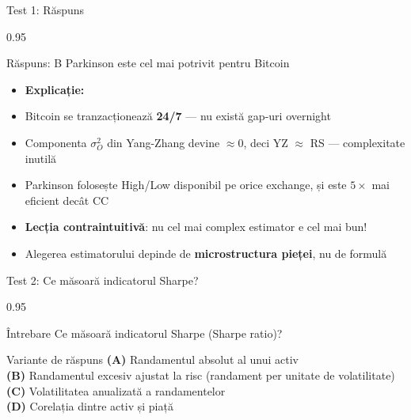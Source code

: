 \documentclass[9pt, aspectratio=169, t]{beamer}
\begin{document}
\begin{frame}[shrink=10]{Test 1: Răspuns}
\begin{cminipage}{0.95\textwidth}
    \begin{exampleblock}{Răspuns: B}
        Parkinson este cel mai potrivit pentru Bitcoin
    \end{exampleblock}

    \vspace{0.2cm}

    \begin{itemize}\setlength{\itemsep}{0pt}
        \item \textbf{Explicație:}
        \item Bitcoin se tranzacționează \textbf{24/7} --- nu există gap-uri overnight
        \item Componenta $\sigma_O^2$ din Yang-Zhang devine $\approx 0$, deci YZ $\approx$ RS --- complexitate inutilă
        \item Parkinson folosește High/Low disponibil pe orice exchange, și este $5\times$ mai eficient decât CC
        \item \textbf{Lecția contraintuitivă}: nu cel mai complex estimator e cel mai bun!
        \item Alegerea estimatorului depinde de \textbf{microstructura pieței}, nu de formulă
    \end{itemize}
\end{cminipage}
\end{frame}

\begin{frame}[shrink=10]{Test 2: Ce măsoară indicatorul Sharpe?}
\begin{cminipage}{0.95\textwidth}
    \begin{alertblock}{Întrebare}
        Ce măsoară indicatorul Sharpe (Sharpe ratio)?
    \end{alertblock}

    \vspace{0.5cm}
    \begin{block}{Variante de răspuns}
    \textcolor{MainBlue}{\textbf{(A)}} Randamentul absolut al unui activ\\[3pt]
    \textcolor{MainBlue}{\textbf{(B)}} Randamentul excesiv ajustat la risc (randament per unitate de volatilitate)\\[3pt]
    \textcolor{MainBlue}{\textbf{(C)}} Volatilitatea anualizată a randamentelor\\[3pt]
    \textcolor{MainBlue}{\textbf{(D)}} Corelația dintre activ și piață
    \end{block}
\end{cminipage}
\end{frame}
\end{document}
